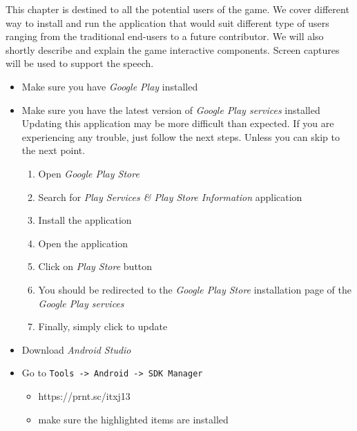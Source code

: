 
This chapter is destined to all the potential users of the game. We cover different way to install and run the application that would suit different type of users ranging from the traditional end-users to a future contributor. We will also shortly describe and explain the game interactive components. Screen captures will be used to support the speech.


\begin{itemize}
	\item Make sure you have \textit{Google Play} installed
	\item Make sure you have the latest version of \textit{Google Play services} installed \newline
  Updating this application may be more difficult than expected. If you are experiencing any trouble, just follow the next steps. Unless you can skip to the next point.
	\begin{enumerate}
    \item Open \textit{Google Play Store}
    \item Search for \textit{Play Services \& Play Store Information} application
    \item Install the application
    \item Open the application
    \item Click on \textit{Play Store} button
    \item You should be redirected to the \textit{Google Play Store} installation page of the \textit{Google Play services}
    \item Finally, simply click to update
	\end{enumerate}
\end{itemize}

\begin{itemize}
	\item Download \textit{Android Studio} %
	\item Go to \texttt{Tools -> Android -> SDK Manager}
	\begin{itemize}
		\item https://prnt.sc/itxj13
		\item make sure the highlighted items are installed
	\end{itemize}
\end{itemize}

